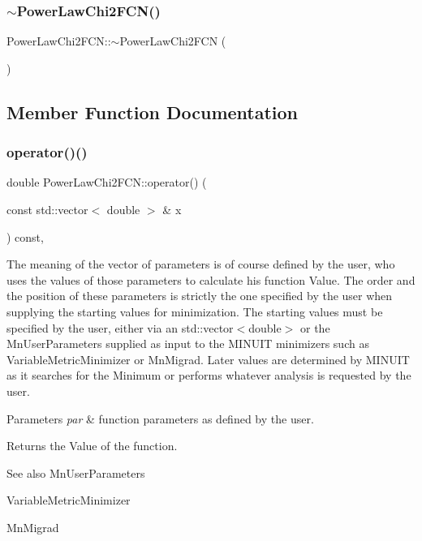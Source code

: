 \subsubsection{\texorpdfstring{$\sim$PowerLawChi2FCN()}{~PowerLawChi2FCN()}}
{\footnotesize\ttfamily Power\+Law\+Chi2\+F\+C\+N\+::$\sim$\+Power\+Law\+Chi2\+F\+CN (\begin{DoxyParamCaption}{ }\end{DoxyParamCaption})\hspace{0.3cm}{\ttfamily [inline]}}



\subsection{Member Function Documentation}
\mbox{\label{classPowerLawChi2FCN_a60b7b03daefc8250dcaaa2d4937f4bfc}} 
\subsubsection{\texorpdfstring{operator()()}{operator()()}}
{\footnotesize\ttfamily double Power\+Law\+Chi2\+F\+C\+N\+::operator() (\begin{DoxyParamCaption}\item[{const std\+::vector$<$ double $>$ \&}]{x }\end{DoxyParamCaption}) const\hspace{0.3cm}{\ttfamily [inline]}, {\ttfamily [virtual]}}

The meaning of the vector of parameters is of course defined by the user, who uses the values of those parameters to calculate his function Value. The order and the position of these parameters is strictly the one specified by the user when supplying the starting values for minimization. The starting values must be specified by the user, either via an std\+::vector$<$double$>$ or the Mn\+User\+Parameters supplied as input to the M\+I\+N\+U\+IT minimizers such as Variable\+Metric\+Minimizer or Mn\+Migrad. Later values are determined by M\+I\+N\+U\+IT as it searches for the Minimum or performs whatever analysis is requested by the user.


\begin{DoxyParams}{Parameters}
{\em par} & function parameters as defined by the user.\\
\hline
\end{DoxyParams}
\begin{DoxyReturn}{Returns}
the Value of the function.
\end{DoxyReturn}
\begin{DoxySeeAlso}{See also}
Mn\+User\+Parameters 

Variable\+Metric\+Minimizer 

Mn\+Migrad 
\end{DoxySeeAlso}


